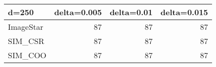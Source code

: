 \begin{tabular}{lrrr}
\hline
 d=250     &   delta=0.005 &   delta=0.01 &   delta=0.015 \\
\hline
 ImageStar &            87 &           87 &            87 \\
 SIM\_CSR   &            87 &           87 &            87 \\
 SIM\_COO   &            87 &           87 &            87 \\
\hline
\end{tabular}
